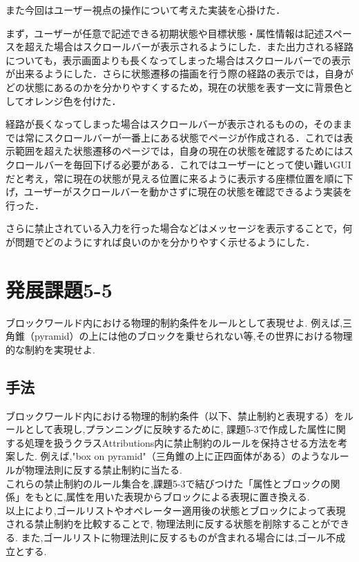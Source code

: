 \documentclass[uplatex,12pt]{jsarticle}
\begin{document}
また今回はユーザー視点の操作について考えた実装を心掛けた．\par
まず，ユーザーが任意で記述できる初期状態や目標状態・属性情報は記述スペースを超えた場合はスクロールバーが表示されるようにした．また出力される経路についても，表示画面よりも長くなってしまった場合はスクロールバーでの表示が出来るようにした．さらに状態遷移の描画を行う際の経路の表示では，自身がどの状態にあるのかを分かりやすくするため，現在の状態を表す一文に背景色としてオレンジ色を付けた．\par
経路が長くなってしまった場合はスクロールバーが表示されるものの，そのままでは常にスクロールバーが一番上にある状態でページが作成される．これでは表示範囲を超えた状態遷移のページでは，自身の現在の状態を確認するためにはスクロールバーを毎回下げる必要がある．これではユーザーにとって使い難いGUIだと考え，常に現在の状態が見える位置に来るように表示する座標位置を順に下げ，ユーザーがスクロールバーを動かさずに現在の状態を確認できるよう実装を行った．\par
さらに禁止されている入力を行った場合などはメッセージを表示することで，何が問題でどのようにすれば良いのかを分かりやすく示せるようにした．


\section{発展課題5-5}
\begin{screen}
    ブロックワールド内における物理的制約条件をルールとして表現せよ.
    例えば,三角錐（pyramid）の上には他のブロックを乗せられない等,その世界における物理的な制約を実現せよ.
\end{screen}
\subsection{手法}
ブロックワールド内における物理的制約条件（以下、禁止制約と表現する）をルールとして表現し,プランニングに反映するために,
課題5-3で作成した属性に関する処理を扱うクラスAttributions内に禁止制約のルールを保持させる方法を考案した.
例えば,"box on pyramid"（三角錐の上に正四面体がある）のようなルールが物理法則に反する禁止制約に当たる. \\
これらの禁止制約のルール集合を,課題5-3で結びつけた「属性とブロックの関係」をもとに,属性を用いた表現からブロックによる表現に置き換える. \\
以上により,ゴールリストやオペレーター適用後の状態とブロックによって表現される禁止制約を比較することで,
物理法則に反する状態を削除することができる.
また,ゴールリストに物理法則に反するものが含まれる場合には,ゴール不成立とする. 
\end{document}
